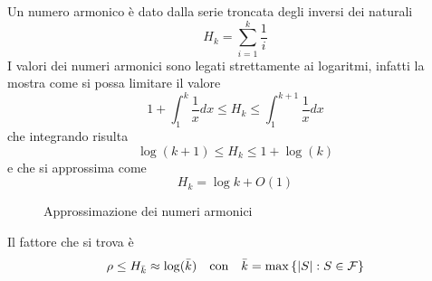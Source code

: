 \begin{definition}
    \label{def:numeroarmonico}
    Un numero armonico è dato dalla serie troncata degli inversi dei naturali
    \begin{equation*}
        H_k = \sum_{i=1}^{k} \frac{1}{i}
    \end{equation*}
    I valori dei numeri armonici sono legati strettamente ai logaritmi, infatti la  mostra come si possa limitare il valore
    \begin{equation*}
        1 + \int_{1}^{k} \frac{1}{x} dx
        \leq
        H_k
        \leq
        \int_{1}^{k+1} \frac{1}{x} dx
    \end{equation*}
    che integrando risulta
    \begin{equation*}
        \log \left( k+1 \right)
        \leq
        H_k
        \leq
        1 + \log \left( k \right)
    \end{equation*}
    e che si approssima come
    \begin{equation*}
        H_k = \log k + O\left( 1 \right)
    \end{equation*}
\end{definition}

\begin{figure}[htp]
    \centering
    \caption{Approssimazione dei numeri armonici}
    \label{fig:numeriarmonici}
\end{figure}

Il fattore che si trova è
\begin{equation*}
    \rho \leq H_{\bar{k}}
    \approx \log (\bar{k})
    \quad
    \text{con}
    \quad
    \bar{k} = \max \left\{ |S| : S \in \mathcal{F} \right\}
\end{equation*}


